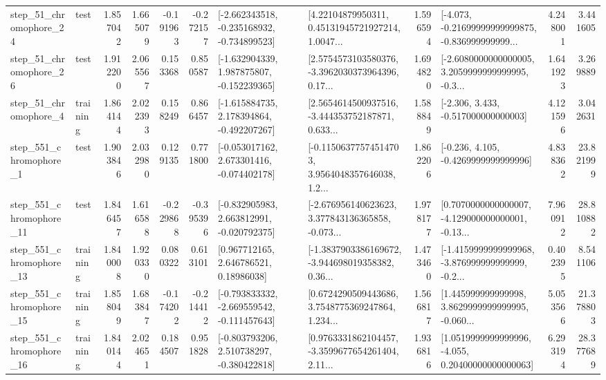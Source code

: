 \begin{tabular}{llrrrrllrlrr}
   step\_51\_chromophore\_24 &      test &      1.857042 &    1.665079 &     -0.191963 & -0.272157 &  [-2.662343518, -0.235168932, -0.734899523] &  [4.22104879950311, 0.45131945721927214, 1.0047... &       1.596594 &  [-4.073, -0.21699999999999875, -0.836999999999... &            4.248001 &          3.441605 \\
   step\_51\_chromophore\_26 &      test &      1.912200 &    2.065567 &      0.153368 &  0.850587 &   [-1.632904339, 1.987875807, -0.152239365] &  [2.5754573103580376, -3.3962030373964396, 0.17... &       1.694820 &  [-2.6080000000000005, 3.2059999999999995, -0.3... &            1.641923 &          3.269889 \\
    step\_51\_chromophore\_4 &  training &      1.864144 &    2.022393 &      0.158249 &  0.866457 &   [-1.615884735, 2.178394864, -0.492207267] &  [2.5654614500937516, -3.444353752187871, 0.633... &       1.588849 &                [-2.306, 3.433, -0.517000000000003] &            4.121596 &          3.042631 \\
   step\_551\_chromophore\_1 &      test &      1.903846 &    2.032980 &      0.129135 &  0.771800 &   [-0.053017162, 2.673301416, -0.074402178] &  [-0.11506377574514703, 3.9564048357646038, 1.2... &       1.862206 &               [-0.236, 4.105, -0.4269999999999996] &            4.838362 &         23.821999 \\
  step\_551\_chromophore\_11 &      test &      1.846457 &    1.616588 &     -0.229868 & -0.395396 &   [-0.832905983, 2.663812991, -0.020792375] &  [-2.676956140623623, 3.377843136365858, -0.073... &       1.978177 &  [0.7070000000000007, -4.129000000000001, -0.13... &            7.960912 &         28.810882 \\
  step\_551\_chromophore\_13 &  training &      1.840008 &    1.920330 &      0.080322 &  0.613101 &      [0.967712165, 2.646786521, 0.18986038] &  [-1.3837903386169672, -3.944698019358382, 0.36... &       1.473460 &  [-1.4159999999999968, -3.876999999999999, -0.2... &            0.402395 &          8.541106 \\
  step\_551\_chromophore\_15 &  training &      1.858049 &    1.683847 &     -0.174202 & -0.214412 &  [-0.793833332, -2.669559542, -0.111457643] &  [0.6724290509443686, 3.7548775369247864, 1.234... &       1.566817 &  [1.445999999999998, 3.8629999999999995, -0.060... &            5.053566 &         21.378803 \\
  step\_551\_chromophore\_16 &  training &      1.840144 &    2.024651 &      0.184507 &  0.951828 &   [-0.803793206, 2.510738297, -0.380422818] &  [0.9763331862104457, -3.3599677654261404, 2.11... &       1.936816 &  [1.0519999999999996, -4.055, 0.20400000000000063] &            6.293194 &         28.377689 \\

\end{tabular}
